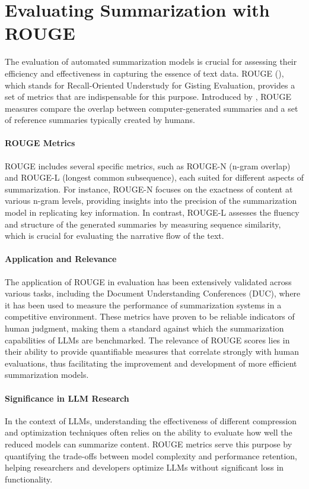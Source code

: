 \section{Evaluating Summarization with ROUGE}\label{sec:rouge}
The evaluation of automated summarization models is crucial for assessing their efficiency and effectiveness in capturing the essence of text data. ROUGE (\cite{lin-2004-rouge}), which stands for Recall-Oriented Understudy for Gisting Evaluation, provides a set of metrics that are indispensable for this purpose. Introduced by \cite{lin-2004-rouge}, ROUGE measures compare the overlap between computer-generated summaries and a set of reference summaries typically created by humans.

\paragraph{ROUGE Metrics}
ROUGE includes several specific metrics, such as ROUGE-N (n-gram overlap) and ROUGE-L (longest common subsequence), each suited for different aspects of summarization. For instance, ROUGE-N focuses on the exactness of content at various n-gram levels, providing insights into the precision of the summarization model in replicating key information. In contrast, ROUGE-L assesses the fluency and structure of the generated summaries by measuring sequence similarity, which is crucial for evaluating the narrative flow of the text.

\paragraph{Application and Relevance}
The application of ROUGE in evaluation has been extensively validated across various tasks, including the Document Understanding Conferences (DUC), where it has been used to measure the performance of summarization systems in a competitive environment. These metrics have proven to be reliable indicators of human judgment, making them a standard against which the summarization capabilities of LLMs are benchmarked. The relevance of ROUGE scores lies in their ability to provide quantifiable measures that correlate strongly with human evaluations, thus facilitating the improvement and development of more efficient summarization models.

\paragraph{Significance in LLM Research}
In the context of LLMs, understanding the effectiveness of different compression and optimization techniques often relies on the ability to evaluate how well the reduced models can summarize content. ROUGE metrics serve this purpose by quantifying the trade-offs between model complexity and performance retention, helping researchers and developers optimize LLMs without significant loss in functionality.
